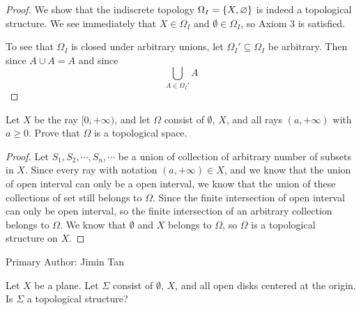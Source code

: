 \begin{proof}
    We show that the indiscrete topology $\Omega_I = \{X, \varnothing\}$ is
    indeed a topological structure. We see immediately that $X \in \Omega_I$ and
    $\emptyset \in \Omega_I$, so Axiom 3 is satisfied.

    To see that $\Omega_I$ is closed under arbitrary unions, let $\Omega_I'
    \subseteq \Omega_I$ be arbitrary. Then since $A \cup A = A$ and since 
    \[
        \bigcup_{A \in \Omega_I'} A
    \]
\end{proof}

\begin{minorEx} %
    Let $X$ be the ray $[0, +\infty)$, and let $\Omega$ consist of $\emptyset$, %
    $X$, and all rays $(a, +\infty)$ with $a \geq 0$. Prove that $\Omega$ is
    a topological space.
\end{minorEx}

\begin{proof}
Let $S_1, S_2, \cdots, S_n, \cdots$ be a union of collection of arbitrary number of subsets in $X$. Since every ray with notation $(a, +\infty) \in X$, and we know that the union of open interval can only be a open interval, we know that the union of these collections of set still belongs to $\Omega$. Since the finite intersection of open interval can only be open interval, so the finite intersection of an arbitrary collection belongs to $\Omega$. We know that $\emptyset$ and $X$ belongs to $\Omega$, so $\Omega$ is a topological structure on $X$.
\end{proof}

Primary Author: Jimin Tan

\begin{minorEx} %
    Let $X$ be a plane. Let $\Sigma$ consist of $\emptyset$, $X$, and all open
    disks centered at the origin. Is $\Sigma$ a topological structure?
\end{minorEx}

